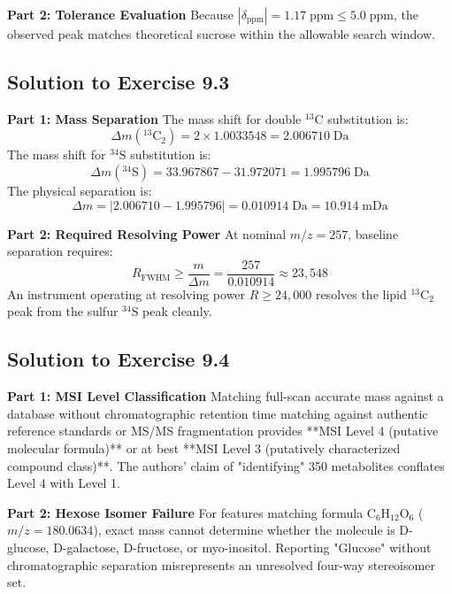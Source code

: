\documentclass[11pt,twoside,openright]{book}
\begin{document}
\noindent\textbf{Part 2: Tolerance Evaluation}\enspace
Because $|\delta_{\text{ppm}}| = 1.17\;\text{ppm} \le 5.0\;\text{ppm}$, the observed peak matches theoretical sucrose within the allowable search window.

\subsection{Solution to Exercise 9.3}

\noindent\textbf{Part 1: Mass Separation}\enspace
The mass shift for double $^{13}\text{C}$ substitution is:
\begin{equation}
\Delta m(^{13}\text{C}_2) = 2 \times 1.0033548 = 2.006710\;\text{Da}
\end{equation}
The mass shift for $^{34}\text{S}$ substitution is:
\begin{equation}
\Delta m(^{34}\text{S}) = 33.967867 - 31.972071 = 1.995796\;\text{Da}
\end{equation}
The physical separation is:
\begin{equation}
\Delta m = |2.006710 - 1.995796| = 0.010914\;\text{Da} = 10.914\;\text{mDa}
\end{equation}

\noindent\textbf{Part 2: Required Resolving Power}\enspace
At nominal $m/z = 257$, baseline separation requires:
\begin{equation}
R_{\text{FWHM}} \ge \frac{m}{\Delta m} = \frac{257}{0.010914} \approx 23,548
\end{equation}
An instrument operating at resolving power $R \ge 24,000$ resolves the lipid $^{13}\text{C}_2$ peak from the sulfur $^{34}\text{S}$ peak cleanly.

\subsection{Solution to Exercise 9.4}

\noindent\textbf{Part 1: MSI Level Classification}\enspace
Matching full-scan accurate mass against a database without chromatographic retention time matching against authentic reference standards or MS/MS fragmentation provides **MSI Level 4 (putative molecular formula)** or at best **MSI Level 3 (putatively characterized compound class)**. The authors' claim of "identifying" 350 metabolites conflates Level 4 with Level 1.

\noindent\textbf{Part 2: Hexose Isomer Failure}\enspace
For features matching formula $\text{C}_6\text{H}_{12}\text{O}_6$ ($m/z = 180.0634$), exact mass cannot determine whether the molecule is D-glucose, D-galactose, D-fructose, or myo-inositol. Reporting "Glucose" without chromatographic separation misrepresents an unresolved four-way stereoisomer set.
\end{document}
